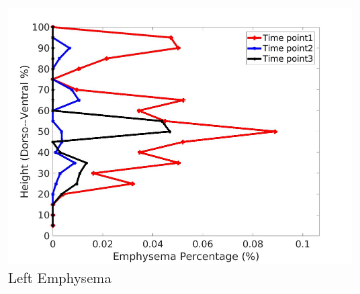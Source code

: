 \begin{figure}[H]
\begin{subfigure}{.42\linewidth}
  \includegraphics[width=\linewidth,trim={{.0\wd0} {.0\wd0} {.0\wd0} {.0\wd0}},clip]{Appendix/Image_AppexA/DorsoToVentral/IPF9LeftLungEmphysemaDiseaseDorsoToVentral.jpg} %
  \caption{Left Emphysema}
  \label{fig:IPF9DiseaseDorsoToVentral-g} 
\end{subfigure} 
\begin{subfigure}{.42\linewidth}%

\end{subfigure}
\end{figure}
